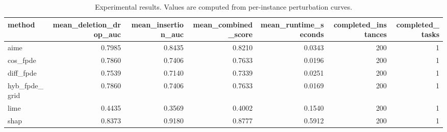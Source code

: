 \begin{table}[t]
\caption{Experimental results. Values are computed from per-instance perturbation curves.}
\label{tab:main_results_computed}
\centering
\begin{tabular}{lrrrrrr}
\toprule
method & mean\_deletion\_drop\_auc & mean\_insertion\_auc & mean\_combined\_score & mean\_runtime\_seconds & completed\_instances & completed\_tasks \\
\midrule
aime & 0.7985 & 0.8435 & 0.8210 & 0.0343 & 200 & 1 \\
cos\_fpde & 0.7860 & 0.7406 & 0.7633 & 0.0196 & 200 & 1 \\
diff\_fpde & 0.7539 & 0.7140 & 0.7339 & 0.0251 & 200 & 1 \\
hyb\_fpde\_grid & 0.7860 & 0.7406 & 0.7633 & 0.0169 & 200 & 1 \\
lime & 0.4435 & 0.3569 & 0.4002 & 0.1540 & 200 & 1 \\
shap & 0.8373 & 0.9180 & 0.8777 & 0.5912 & 200 & 1 \\
\bottomrule
\end{tabular}

\end{table}
